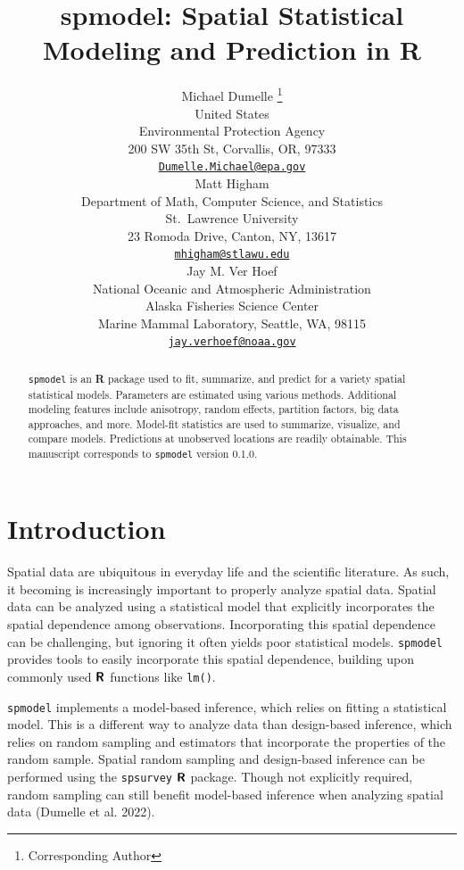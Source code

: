 \documentclass{article}
\title{spmodel: Spatial Statistical Modeling and Prediction in \textbf{R}}
\author{
    Michael Dumelle
    \thanks{Corresponding Author}
   \\
    United States \\
    Environmental Protection Agency \\
  200 SW 35th St, Corvallis, OR, 97333 \\
  \texttt{\href{mailto:Dumelle.Michael@epa.gov}{\nolinkurl{Dumelle.Michael@epa.gov}}} \\
   \And
    Matt Higham
   \\
    Department of Math, Computer Science, and Statistics \\
    St.~Lawrence University \\
  23 Romoda Drive, Canton, NY, 13617 \\
  \texttt{\href{mailto:mhigham@stlawu.edu}{\nolinkurl{mhigham@stlawu.edu}}} \\
   \And
    Jay M. Ver Hoef
   \\
    National Oceanic and Atmospheric Administration \\
    Alaska Fisheries Science Center \\
  Marine Mammal Laboratory, Seattle, WA, 98115 \\
  \texttt{\href{mailto:jay.verhoef@noaa.gov}{\nolinkurl{jay.verhoef@noaa.gov}}} \\
  }
\begin{document}
\maketitle


\begin{abstract}
\texttt{spmodel} is an \textbf{\textsf{R}} package used to fit,
summarize, and predict for a variety spatial statistical models.
Parameters are estimated using various methods. Additional modeling
features include anisotropy, random effects, partition factors, big data
approaches, and more. Model-fit statistics are used to summarize,
visualize, and compare models. Predictions at unobserved locations are
readily obtainable. This manuscript corresponds to \texttt{spmodel}
version 0.1.0.
\end{abstract}


\hypertarget{sec:introduction}{%
\section{Introduction}\label{sec:introduction}}

Spatial data are ubiquitous in everyday life and the scientific
literature. As such, it becoming is increasingly important to properly
analyze spatial data. Spatial data can be analyzed using a statistical
model that explicitly incorporates the spatial dependence among
observations. Incorporating this spatial dependence can be challenging,
but ignoring it often yields poor statistical models. \texttt{spmodel}
provides tools to easily incorporate this spatial dependence, building
upon commonly used \(\textbf{\textsf{R}}\) functions like \texttt{lm()}.

\texttt{spmodel} implements a model-based inference, which relies on
fitting a statistical model. This is a different way to analyze data
than design-based inference, which relies on random sampling and
estimators that incorporate the properties of the random sample. Spatial
random sampling and design-based inference can be performed using the
\texttt{spsurvey} \(\textbf{\textsf{R}}\) package. Though not explicitly
required, random sampling can still benefit model-based inference when
analyzing spatial data (Dumelle et al. 2022).
\end{document}

